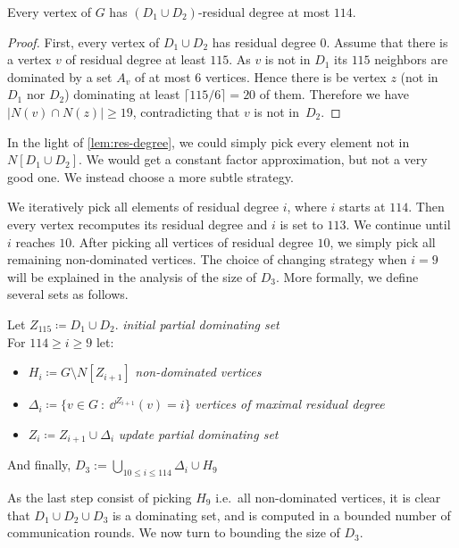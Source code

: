 \documentclass[a4paper,UKenglish,thm-restate,numberwithinsect]{lipics-v2021}
\begin{document}
\begin{lemma}\label{lem:res-degree}
  Every vertex of $G$ has $(D_1\cup D_2)$-residual degree at most $114$.
\end{lemma}
\begin{proof}
  First, every vertex of $D_1\cup D_2$ has residual degree $0$.
  Assume that there is a vertex $v$ of residual degree at least $115$.
  As $v$ is not in $D_1$ its $115$ neighbors are dominated by a
  set $A_v$ of at most 6 vertices. Hence there is be vertex $z$ (not in $D_1$
  nor $D_2$) dominating at least $\lceil 115/6\rceil = 20$ of them. Therefore we
  have $|N(v)\cap N(z)|\geq 19$, contradicting that $v$ is not in~$D_2$.
\end{proof}

In the light of \cref{lem:res-degree}, we could simply pick every element not in $N[D_1\cup D_2]$.
We would get a constant factor approximation,
but not a very good one. We instead choose a more subtle strategy.

We iteratively pick all elements of residual degree $i$, where $i$ starts at
$114$. Then every vertex recomputes its residual degree and $i$ is set to $113$.
We continue until $i$ reaches $10$. After picking all vertices of residual
degree $10$, we simply pick all remaining non-dominated vertices.
The choice of changing strategy when $i=9$ will be explained in the analysis
of the size of $D_3$.
More formally, we define several sets as follows.
\begin{tcolorbox}[colback=red!5!white,colframe=red!50!black]
  Let $Z_{115}\coloneqq D_1\cup D_2$. \hfill \textit{\small initial partial dominating set}\\
  For $114\geq i\geq 9$ let:
  \begin{itemize}
    \item $H_i \coloneqq G\setminus N[Z_{i+1}]$ \hfill \textit{\small non-dominated vertices}
    \item $\Delta_i \coloneqq \{v\in G ~:~ \dd^{Z_{i+1}}(v)=i\}$ \hfill \textit{\small vertices of maximal residual degree}
    \item $Z_{i} \coloneqq Z_{i+1} \cup \Delta_i$ \hfill \textit{\small update partial dominating set}
  \end{itemize}

  And finally, $D_3:= \bigcup\limits_{10\le i\le 114} \Delta_i  \cup H_{9}$
\end{tcolorbox}

As the last step consist of picking $H_9$ i.e.\ all non-dominated vertices, it
is clear that $D_1\cup D_2\cup D_3$ is a dominating set, and is computed in a
bounded number of communication rounds. We now turn to bounding the size of $D_3$.
\end{document}
